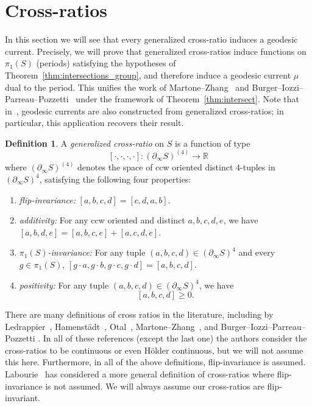 \documentclass[11pt]{amsart}
\numberwithin{equation}{section}
\numberwithin{figure}{section}
\theoremstyle{definition}
\newtheorem{definition}[theorem]{Definition}
\theoremstyle{plain}
\begin{document}

\section{Cross-ratios}
\label{sec:crossratios}

In this section we will see that every generalized cross-ratio induces a geodesic current. Precisely, we will prove that generalized cross-ratios induce functions on $\pi_1(S)$ (periods) satisfying the hypotheses of Theorem~\ref{thm:intersections_group}, and therefore induce a geodesic current $\mu$ dual to the period. This unifies the work of Martone--Zhang~\cite{MZ19:PositivelyRatioed} and Burger--Iozzi--Parreau--Pozzetti~\cite{BIPP24:PositiveCrossratios} under the framework of Theorem~\ref{thm:intersect}. Note that in~\cite{BIPP24:PositiveCrossratios}, geodesic currents are also constructed from generalized cross-ratios; in particular, this application recovers their result.

\begin{definition}
A \emph{generalized cross-ratio} on $S$ is a function of type
\[
[\cdot, \cdot, \cdot, \cdot] \colon (\partial_{\infty} S)^{(4)} \to \mathbb{R}
\]
where $(\partial_{\infty} S)^{(4)}$ denotes the space of ccw oriented distinct 4-tuples in $(\partial_{\infty} S)^{4}$, satisfying the following four properties:
\begin{enumerate}
\item \emph{flip-invariance:} $[a,b,c,d]=[c,d,a, b].$
\item \emph{additivity:} For any ccw oriented and distinct $a,b,c,d,e$, we have
$[a,b, d, e]=[a,b,c,e] + [a,c,d, e]$.
\item \emph{$\pi_1(S)$-invariance:} For any tuple $(a,b,c,d) \in (\partial_{\infty} S)^{4}$ and every $g \in \pi_1(S)$, $[g \cdot a, g \cdot b, g \cdot c, g \cdot d] = [a,b,c,d]$.
\item \emph{positivity:}  For any tuple $(a,b,c,d) \in (\partial_{\infty} S)^{4}$, we have
\[
[a,b,c,d] \geq 0.
\]
\end{enumerate}
\label{def:general_crossratio}
\end{definition}

There are many definitions of cross ratios in the literature,
including by Ledrappier~\cite{L95:BordDesVar},
Hamenst\"adt~\cite{Ham99:Cocycles}, Otal~\cite{Ot92:Symplectique},
Martone--Zhang~\cite{MZ19:PositivelyRatioed}, and
Burger--Iozzi--Parreau--Pozzetti \cite{BIPP24:PositiveCrossratios}.
In all of these references (except the last one) the authors consider the cross-ratios to be continuous or even H\"older continuous, but we will not assume this here. Furthermore, in all of the above definitions, flip-invariance is assumed.
Labourie~\cite[Definition~3.1]{L07:Crossratio} has considered a more general definition of cross-ratios where flip-invariance is not assumed.  We will always assume our cross-ratios are flip-invariant.
\end{document}
